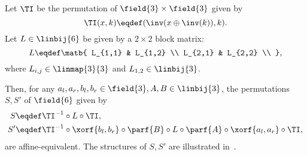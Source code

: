 \begin{theorem}
Let $\TI$ be the permutation of $\field{3}\times\field{3}$ given by
$$
\TI(x,k) \eqdef (\inv(x \oplus \inv(k)), k).
$$
Let $L \in \linbij{6}$ be given by a $2 \times 2$ block matrix:
$$
L \eqdef \matb{
L_{1,1} & L_{1,2} \\
L_{2,1} & L_{2,2} \\
},
$$
where $L_{i,j} \in \linmap{3}{3}$ and $L_{1,2} \in \linbij{3}$.

Then, for any $a_l, a_r, b_l, b_r \in \field{3}, A,B \in \linbij{3}$, the permutations $S,S'$ of $\field{6}$ given by
\begin{align*}
     S &\eqdef \TI^{-1} \circ L \circ \TI,\\
    S' &\eqdef \TI^{-1} \circ \xorf{b_l,b_r} \circ \parf{B} \circ L \circ \parf{A} \circ \xorf{a_l,a_r} \circ \TI,
\end{align*}
are affine-equivalent. The structures of $S,S'$ are illustrated in~.

\end{theorem}
